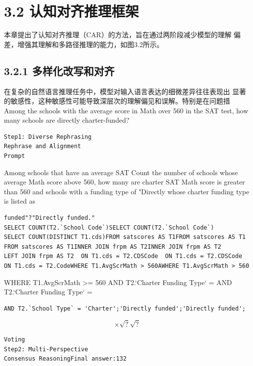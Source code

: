 \documentclass[12pt,a4paper,openright,UTF8]{ctexbook}
\begin{document}
\section{3.2 认知对齐推理框架}

本章提出了认知对齐推理（CAR）的方法，旨在通过两阶段减少模型的理解 偏差，增强其理解和多路径推理的能力，如图3.2所示。

\subsection{3.2.1 多样化改写和对齐}

在复杂的自然语言推理任务中，模型对输入语言表达的细微差异往往表现出 显著的敏感性，这种敏感性可能导致深层次的理解偏见和误解。特别是在问题措 Among the schools with the average score in Math over 560 in the SAT test, how many schools are directly charter-funded?

\begin{lstlisting}
Step1: Diverse Rephrasing
Rephrase and Alignment
Prompt
\end{lstlisting}
Among schools that have an average SAT Count the number of schools whose average Math score above 560, how many are charter SAT Math score is greater than 560 and schools with a funding type of "Directly whose charter funding type is listed as

\begin{lstlisting}
funded"?"Directly funded."
SELECT COUNT(T2.`School Code`)SELECT COUNT(T2.`School Code`)
SELECT COUNT(DISTINCT T1.cds)FROM satscores AS T1FROM satscores AS T1
FROM satscores AS T1INNER JOIN frpm AS T2INNER JOIN frpm AS T2
LEFT JOIN frpm AS T2  ON T1.cds = T2.CDSCode  ON T1.cds = T2.CDSCode
ON T1.cds = T2.CodeWHERE T1.AvgScrMath > 560AWHERE T1.AvgScrMath > 560
\end{lstlisting}
WHERE T1.AvgScrMath >= 560 AND T2.`Charter Funding Type` = AND T2.`Charter Funding Type` =

\begin{lstlisting}
AND T2.`School Type` = 'Charter';'Directly funded';'Directly funded';
\end{lstlisting}

\begin{equation*}
\times\sqrt{?}\sqrt{?}
\end{equation*}

\begin{lstlisting}
Voting
Step2: Multi-Perspective
Consensus ReasoningFinal answer:132
\end{lstlisting}
\end{document}

